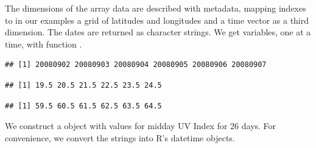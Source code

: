 \documentclass[krantz2]{krantz}\usepackage{knitr}%
\begin{document}
The dimensions of the array data are described with metadata, mapping indexes to in our examples a grid of latitudes and longitudes and a time vector as a third dimension. The dates are returned as character strings. We get variables, one at a time, with function .

\begin{knitrout}\footnotesize
{}\color{fgcolor}\begin{kframe}
\begin{alltt}
 \hlkwb{<-}  \hlstd{)}
\end{alltt}
\begin{verbatim}
## [1] 20080902 20080903 20080904 20080905 20080906 20080907
\end{verbatim}
\begin{alltt}
 \hlkwb{<-}   \hlstd{)}
\end{alltt}
\begin{verbatim}
## [1] 19.5 20.5 21.5 22.5 23.5 24.5
\end{verbatim}
\begin{alltt}
 \hlkwb{<-}   \hlstd{)}
\end{alltt}
\begin{verbatim}
## [1] 59.5 60.5 61.5 62.5 63.5 64.5
\end{verbatim}
\end{kframe}
\end{knitrout}

We construct a  object with values for midday UV Index for 26 days. For convenience, we convert the strings into R's datetime objects.
\end{document}
